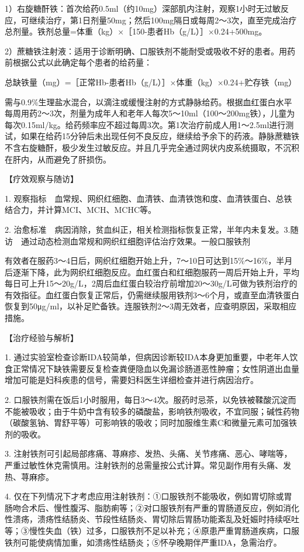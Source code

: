 1）右旋糖酐铁：首次给药0.5ml（约10mg）深部肌内注射，观察1小时无过敏反应，可继续治疗，第1日剂量50mg；然后100mg隔日或每周2～3次，直至完成治疗总剂量。铁剂总量=体重（kg）×［150-患者Hb（g/L）］×0.24+500mg。

2）蔗糖铁注射液：适用于诊断明确、口服铁剂不能耐受或吸收不好的患者。用药前根据公式以此确定每个患者的给药量：

总缺铁量（mg）=［正常Hb-患者Hb（g/L）］×体重（kg）×0.24+贮存铁（mg）

需与0.9\%生理盐水混合，以滴注或缓慢注射的方式静脉给药。根据血红蛋白水平每周用药2～3次，剂量为成年人和老年人每次5～10ml（100～200mg铁），儿童为每次0.15ml/kg。给药频率应不超过每周3次。第1次治疗前成人用1～2.5ml进行测试，如果在给药15分钟后未出现任何不良反应，继续给予余下的药液。静脉蔗糖铁不含右旋糖酐，极少发生过敏反应。并且几乎完全通过网状内皮系统摄取，不沉积在肝内，从而避免了肝损伤。

【疗效观察与随访】

1.
观察指标　血常规、网织红细胞、血清铁、血清铁饱和度、血清铁蛋白、总铁结合力，并计算MCI、MCH、MCHC等。

2.
治愈标准　病因消除，贫血纠正，相关检测指标恢复正常，半年内未复发。3.随访　通过动态检测血常规和网织红细胞评估治疗效果。一般口服铁剂

有效者在服药3～4日后，网织红细胞开始上升，7～10日可达到15\%～16\%，半月后逐渐下降，此为网织红细胞反应。血红蛋白和红细胞服药一周后开始上升，平均每日可上升15～20g/L，2周后血红蛋白较治疗前增加20～30g/L可做为铁剂治疗的有效指征。血红蛋白恢复正常后，仍需继续服用铁剂3～6个月，或直至血清铁蛋白恢复到50μg/ml，以补足贮备铁。连服铁剂2～3周无效者，应查明原因，采取相应措施。

【治疗经验与解析】

1.
通过实验室检查诊断IDA较简单，但病因诊断较IDA本身更加重要，中老年人饮食正常情况下缺铁需要反复检查粪便隐血以免漏诊肠道恶性肿瘤；女性阴道出血量增加可能是妇科疾患的信号，需要妇科医生详细检查并进行病因治疗。

2.
口服铁剂需在饭后1小时服用，每日3～4次。服药时忌茶，以免铁被鞣酸沉淀而不能被吸收；由于牛奶中含有较多的磷酸盐，影响铁剂吸收，不宜同服；碱性药物（碳酸氢钠、胃舒平等）可影响铁的吸收；同时加服维生素C和微量元素可加强铁剂的吸收。

3.
注射铁剂可引起局部疼痛、荨麻疹、发热、头痛、关节疼痛、恶心、哮喘等，严重过敏性休克需慎用。注射铁剂的总需量按公式计算。常见副作用有头痛、发热、荨麻疹。

4.
仅在下列情况下才考虑应用注射铁剂：①口服铁剂不能吸收，例如胃切除或胃肠吻合术后、慢性腹泻、脂肪痢等；②对口服铁剂有严重的胃肠道反应，例如消化性溃疡，溃疡性结肠炎、节段性结肠炎、胃切除后胃肠功能紊乱及妊娠时持续呕吐等；③慢性失血（铁）过多，口服铁剂不足以补充；④原患严重胃肠道疾病，口服铁剂可能使病情加重，如溃疡性结肠炎；⑤怀孕晚期伴严重IDA，急需治疗。

